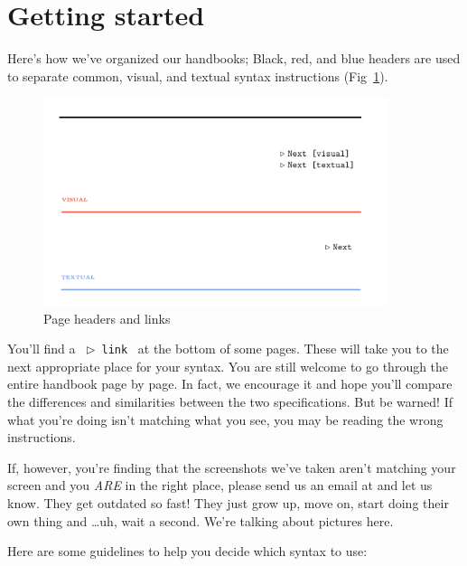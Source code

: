 \section{Getting started}
\genHeader 

Here's how we've organized our handbooks; Black, red, and blue headers are used to separate common, visual, and textual syntax instructions
(Fig~\ref{pageExamples}).

\begin{figure}[htbp] \centering
  \includegraphics[width=0.9\textwidth]{headers}
	\caption{Page headers and links}
	\label{pageExamples}
\end{figure}

You'll find a \mbox{ $\triangleright$ {\texttt{link}} } at the bottom of some pages. These will take you to the next appropriate place for your syntax. You are
still welcome to go through the entire handbook page by page. In fact, we encourage it and hope you'll compare the differences and similarities between the two
specifications. But be warned! If what you're doing isn't matching what you see, you may be reading the wrong instructions.

If, however, you're finding that the screenshots we've taken aren't matching your screen and you \emph{ARE} in the right place, please send us an email at
\eMoflonContact{} and let us know. They get outdated so fast! They just grow up, move on, start doing their own thing and
\ldots uh, wait a second. We're talking about pictures here.

Here are some guidelines to help you decide which syntax to use:

